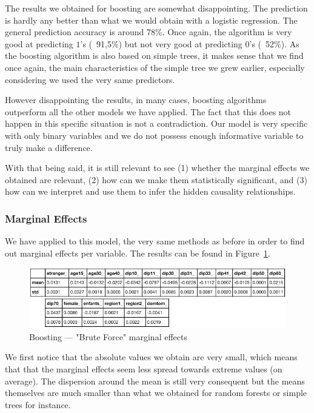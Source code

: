 The results we obtained for boosting are somewhat disappointing. The prediction is hardly any better than what we would obtain with a logistic regression. The general prediction accuracy is around 78\%. Once again, the algorithm is very good at predicting $1$’s (~91,5\%) but not very good at predicting $0$’s (~52\%). As the boosting algorithm is also based on simple trees, it makes sense that we find once again, the main characteristics of the simple tree we grew earlier, especially considering we used the very same predictors.

However disappointing the results, in many cases, boosting algorithms outperform all the other models we have applied. The fact that this does not happen in this specific situation is not a contradiction. Our model is very specific with only binary variables and we do not possess enough informative variable to truly make a difference.

With that being said, it is still relevant to see (1) whether the marginal effects we obtained are relevant, (2) how can we make them statistically significant, and (3) how can we interpret and use them to infer the hidden causality relationships.

\subsubsection{Marginal Effects}
We have applied to this model, the very same methods as before in order to find out marginal effects per variable. The results can be found in Figure~\ref{fig:boosting_brute_force}.

\begin{figure}
    \centering
    \includegraphics[scale=0.25]{img/boosting_brute_force.png}
    \caption{Boosting --- "Brute Force" marginal effects}
    \label{fig:boosting_brute_force}
\end{figure}

We first notice that the absolute values we obtain are very small, which means that that the marginal effects seem less spread towards extreme values (on average). The dispersion around the mean is still very consequent but the means themselves are much smaller than what we obtained for random forests or simple trees for instance.

